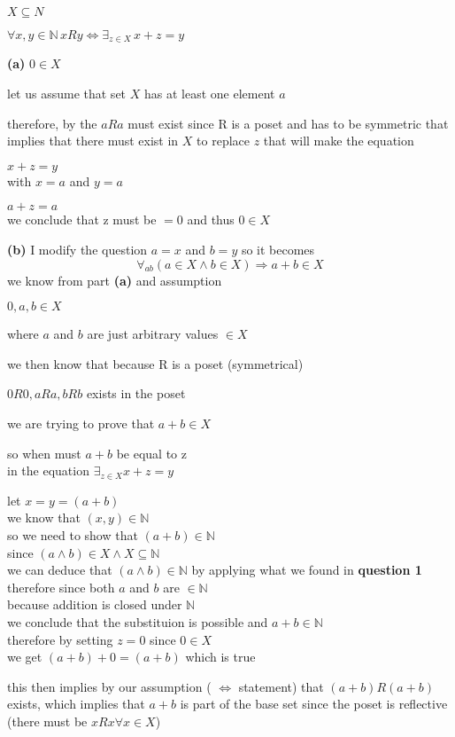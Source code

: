 \documentclass[12pts,A4]{article}
\begin{document}
\begin{flushleft}
    
    $ X \subseteq N $

    $ \forall x,y \in \mathbb{N}\, xRy \iff \exists_{z \in X} \,x+z = y$

    \textbf{(a)} $0 \in X$

    let us assume that set $X$ has at least one element $a$ 
    
    therefore, by the $aRa$ must exist since R is a poset and has to be symmetric
    that implies that there must exist in $X$ to replace $z$ that will make the equation
    
    $ x+z = y$\\
    with $ x=a$ and $y=a$

    $a + z = a $\\
    we conclude that z must be $=0$ and thus $ 0 \in X$


    
    
    \textbf{(b)} 
    I modify the question $ a=x$ and $ b=y$ so it becomes 
    $$ \forall_{a b} (a \in X \wedge b \in X) \Rightarrow a + b \in X $$
    we know from part \textbf{(a)}  and assumption

    
    $0,a,b \in X$

    where $a$ and $b$ are just arbitrary values $\in X$
    
    we then know that because R is a poset (symmetrical)

    $ 0R0 , aRa, bRb $ exists in the poset
    
    \bigskip
    we are trying to prove that $a+b \in X$
    
    so when must $a+b$ be equal to z \\
    in the equation $\exists_{z \in X} x + z = y$
         
    let $ x = y = (a+b) $\\
    we know that $ (x, y)\in \mathbb{N}$\\
    so we need to show that $(a+b) \in \mathbb{N}$\\
    since $ (a \wedge b) \in X \wedge X \subseteq \mathbb{N}$\\

    we can deduce that $(a \wedge b) \in \mathbb{N}$ by applying what we found in \textbf{question 1}\\ 
    therefore since both $a$ and $b$ are $ \in \mathbb{N}$\\
    because addition is closed under $\mathbb{N}$\\ 
    we conclude that the substituion is possible and $a+b \in \mathbb{N}$\\

    \bigskip
    therefore by setting $z = 0$ since $0 \in X$\\

    we get $(a+b) + 0 = (a+b)$ which is true

    this then implies by our assumption ( $\iff$ statement) 
    that $ (a+b)R(a+b)$ exists, which implies that $a+b$ is part of the base set since the poset is reflective\\
    (there must be $xRx \forall x \in X$)

\end{flushleft}
\end{document}
